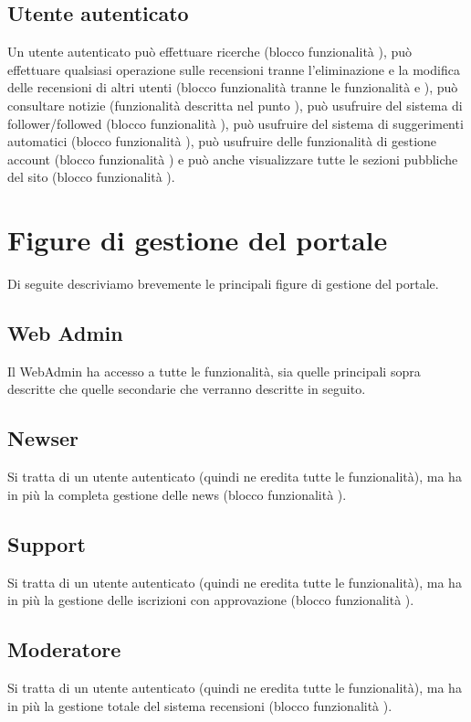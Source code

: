 \subsection{Utente autenticato}
Un utente autenticato può effettuare ricerche (blocco funzionalità ), può effettuare qualsiasi operazione sulle recensioni tranne l’eliminazione e la modifica delle recensioni di altri utenti (blocco funzionalità  tranne le funzionalità  e ),  può consultare notizie (funzionalità descritta nel punto ), può usufruire del sistema di follower/followed  (blocco funzionalità ), può usufruire del sistema di suggerimenti automatici  (blocco funzionalità ), può usufruire delle funzionalità di gestione account (blocco funzionalità ) e può anche visualizzare tutte le sezioni pubbliche del sito  (blocco funzionalità ).

\section{Figure di gestione del portale}
Di seguite descriviamo brevemente le principali figure di gestione del portale.

\subsection{Web Admin}
Il WebAdmin ha accesso a tutte le funzionalità, sia quelle principali sopra descritte che quelle secondarie che verranno descritte in seguito.

\subsection{Newser}
Si tratta di un utente autenticato (quindi ne eredita tutte le funzionalità), ma ha in più la completa gestione delle news (blocco funzionalità ).

\subsection{Support}
Si tratta di un utente autenticato (quindi ne eredita tutte le funzionalità), ma ha in più la gestione delle iscrizioni con approvazione (blocco funzionalità ).

\subsection{Moderatore}
Si tratta di un utente autenticato (quindi ne eredita tutte le funzionalità), ma ha in più la gestione totale del sistema recensioni (blocco funzionalità ).

